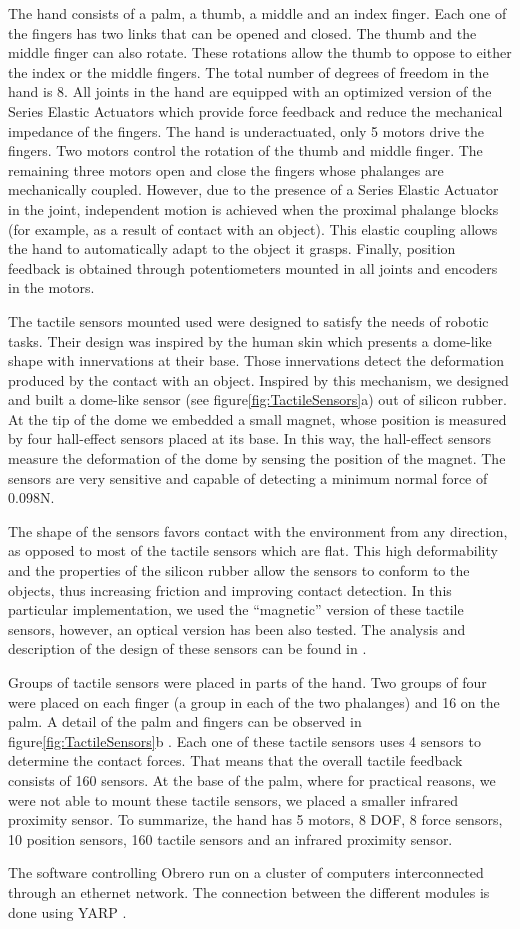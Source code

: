 The hand consists of a palm, a thumb, a middle and an index
finger. Each one of the fingers has two links that can be opened
and closed. The thumb and the middle finger can also rotate. These
rotations allow the thumb to oppose to either the index or the
middle fingers. The total number of degrees of freedom in the hand
is 8. All joints in the hand are equipped with an optimized
version of the Series Elastic Actuators \cite{actuator} which
provide force feedback and reduce the mechanical impedance of the
fingers. The hand is underactuated, only 5 motors drive the
fingers. Two motors control the rotation of the thumb and middle
finger. The remaining three motors open and close the fingers
whose phalanges are mechanically coupled. However, due to the
presence of a Series Elastic Actuator in the joint, independent
motion is achieved when the proximal phalange blocks (for example,
as a result of contact with an object). This elastic coupling
allows the hand to automatically adapt to the object it grasps.
Finally, position feedback is obtained through potentiometers
mounted in all joints and encoders in the motors.

The tactile sensors mounted used were designed to satisfy the
needs of robotic tasks. Their design was inspired by the human
skin which presents a dome-like shape with innervations at their
base. Those innervations detect the deformation produced by the
contact with an object. Inspired by this mechanism, we designed
and built a dome-like sensor (see figure\ref{fig:TactileSensors}a)
out of silicon rubber. At the tip of the dome we embedded a small
magnet, whose position is measured by four hall-effect sensors
placed at its base. In this way, the hall-effect sensors measure
the deformation of the dome by sensing the position of the magnet.
The sensors are very sensitive and capable of detecting a minimum
normal force of 0.098N.

The shape of the sensors favors contact with the environment from
any direction, as opposed to most of the tactile sensors which are
flat. This high deformability and the properties of the silicon
rubber allow the sensors to conform to the objects, thus
increasing friction and improving contact detection. In this
particular implementation, we used the ``magnetic'' version of
these tactile sensors, however, an optical version has been also
tested. The analysis and description of the design of these
sensors can be found in \cite{etorresjSoft}.

Groups of tactile sensors were placed in parts of the hand. Two
groups of four were placed on each finger (a group in each of the
two phalanges) and 16 on the palm. A detail of the palm and
fingers can be observed in figure\ref{fig:TactileSensors}b . Each
one of these tactile sensors uses 4 sensors to determine the
contact forces. That means that the overall tactile feedback
consists of 160 sensors. At the base of the palm, where for
practical reasons, we were not able to mount these tactile
sensors, we placed a smaller infrared proximity sensor. To
summarize, the hand has 5 motors, 8 DOF, 8 force sensors, 10
position sensors, 160 tactile sensors and an infrared proximity
sensor.

The software controlling Obrero run on a cluster of computers
interconnected through an ethernet network. The connection between
the different modules is done using YARP \cite{yarpPaper}.
